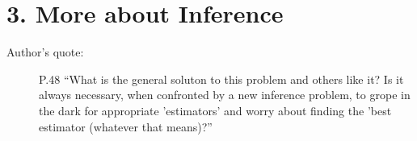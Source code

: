 \documentclass{article}
\begin{document}
\chapter{3. More about Inference}
\begin{description}
\item [Author's quote:] P.48 ``What is the general soluton to this problem and
  others like it? Is it always necessary, when confronted by a new inference
  problem, to grope in the dark for appropriate 'estimators' and worry about
  finding the 'best estimator (whatever that means)?''
\end{description}


    
    




\end{document}
